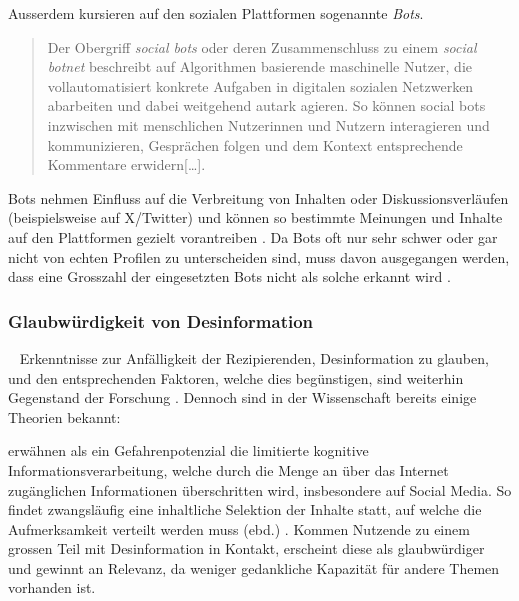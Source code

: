 \documentclass[12pt,a4paper]{article}        %
\begin{document}
Ausserdem kursieren auf den sozialen Plattformen sogenannte \textit{Bots}.
\begin{quote}
  Der Obergriff  \textit{social bots} oder deren Zusammenschluss zu einem \textit{social botnet} beschreibt auf Algorithmen basierende maschinelle Nutzer, die vollautomatisiert konkrete Aufgaben in digitalen sozialen Netzwerken abarbeiten und dabei weitgehend autark agieren. So können social bots inzwischen mit menschlichen Nutzerinnen und Nutzern interagieren und kommunizieren, Gesprächen folgen und dem Kontext entsprechende Kommentare erwidern[\ldots]. \parencite[493f]{behnke_manipulation_2018}
\end{quote}
Bots nehmen Einfluss auf die Verbreitung von Inhalten oder Diskussionsverläufen (beispielsweise auf X/Twitter) und können so bestimmte Meinungen und Inhalte auf den Plattformen gezielt vorantreiben \parencite[495f]{behnke_manipulation_2018}. Da Bots oft nur sehr schwer oder gar nicht von echten Profilen zu unterscheiden sind, muss davon ausgegangen werden, dass eine Grosszahl der eingesetzten Bots nicht als solche erkannt wird \parencite[1095]{lazer_science_2018}.

\subsubsection{Glaubwürdigkeit von Desinformation} 
~\label{theory_credibility}
Erkenntnisse zur Anfälligkeit der Rezipierenden, Desinformation zu glauben, und den entsprechenden Faktoren, welche dies begünstigen, sind weiterhin Gegenstand der Forschung \parencites[1094]{lazer_science_2018}[486]{schaewitz_when_2020}. Dennoch sind in der Wissenschaft bereits einige Theorien bekannt:

\textcite[248]{hohlfeld_schlechte_2020} erwähnen als ein Gefahrenpotenzial die limitierte kognitive Informationsverarbeitung, welche durch die Menge an über das Internet zugänglichen Informationen überschritten wird, insbesondere auf Social Media. So findet zwangsläufig eine inhaltliche Selektion der Inhalte statt, auf welche die Aufmerksamkeit verteilt werden muss (ebd.) \parencite[vgl.\ auch][5]{tandoc_jr_facts_2019}. Kommen Nutzende zu einem grossen Teil mit Desinformation in Kontakt, erscheint diese als glaubwürdiger und gewinnt an Relevanz, da weniger gedankliche Kapazität für andere Themen vorhanden ist.
\end{document}
